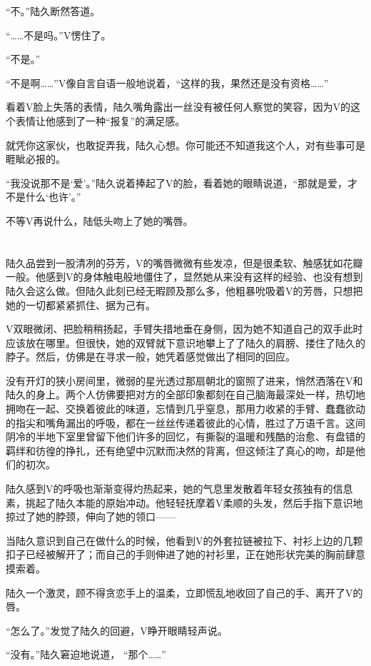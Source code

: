 “不。”陆久断然答道。

“……不是吗。”V愣住了。

“不是。”

“不是啊……”V像自言自语一般地说着，“这样的我，果然还是没有资格……”

看着V脸上失落的表情，陆久嘴角露出一丝没有被任何人察觉的笑容，因为V的这个表情让他感到了一种“报复”的满足感。

就凭你这家伙，也敢捉弄我，陆久心想。你可能还不知道我这个人，对有些事可是睚眦必报的。

“我没说那不是‘爱’。”陆久说着捧起了V的脸，看着她的眼睛说道，“那就是爱，才不是什么‘也许’。”

不等V再说什么，陆低头吻上了她的嘴唇。

\section*{}

陆久品尝到一股清冽的芬芳，V的嘴唇微微有些发凉，但是很柔软、触感犹如花瓣一般。他感到V的身体触电般地僵住了，显然她从来没有这样的经验、也没有想到陆久会这么做。但陆久此刻已经无暇顾及那么多，他粗暴吮吸着V的芳唇，只想把她的一切都紧紧抓住、据为己有。

V双眼微闭、把脸稍稍扬起，手臂失措地垂在身侧，因为她不知道自己的双手此时应该放在哪里。但很快，她的双臂就下意识地攀上了了陆久的肩膀、搂住了陆久的脖子。然后，仿佛是在寻求一般，她凭着感觉做出了相同的回应。

没有开灯的狭小房间里，微弱的星光透过那扇朝北的窗照了进来，悄然洒落在V和陆久的身上。两个人仿佛要把对方的全部印象都刻在自己脑海最深处一样，热切地拥吻在一起、交换着彼此的味道，忘情到几乎窒息，那用力收紧的手臂、蠢蠢欲动的指尖和嘴角漏出的呼吸，都在一丝丝传递着彼此的心情，胜过了万语千言。这间阴冷的半地下室里曾留下他们许多的回忆，有撕裂的温暖和残酷的治愈、有盘错的羁绊和彷徨的挣扎，还有绝望中沉默而决然的背离，但这倾注了真心的吻，却是他们的初次。

陆久感到V的呼吸也渐渐变得灼热起来，她的气息里发散着年轻女孩独有的信息素，挑起了陆久本能的原始冲动。他轻轻抚摩着V柔顺的头发，然后手指下意识地掠过了她的脖颈，伸向了她的领口——

当陆久意识到自己在做什么的时候，他看到V的外套拉链被拉下、衬衫上边的几颗扣子已经被解开了；而自己的手则伸进了她的衬衫里，正在她形状完美的胸前肆意摸索着。

陆久一个激灵，顾不得贪恋手上的温柔，立即慌乱地收回了自己的手、离开了V的唇。

“怎么了。”发觉了陆久的回避，V睁开眼睛轻声说。

“没有。”陆久窘迫地说道， “那个……”

